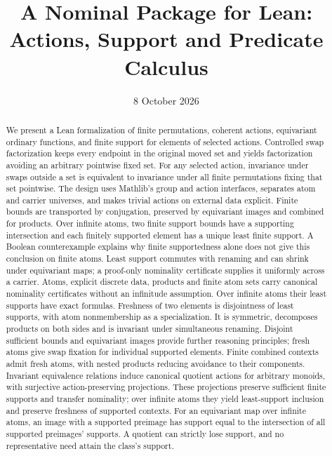 \documentclass[11pt]{article}
\title{A Nominal Package for Lean:\\Actions, Support and Predicate Calculus}
\author{}
\date{8 October 2026}
\theoremstyle{definition}
\theoremstyle{remark}
\begin{document}
\maketitle

\begin{abstract}
We present a Lean formalization of
finite permutations, coherent actions, equivariant ordinary functions,
and finite support for elements of selected actions.
Controlled swap factorization keeps every endpoint in the original moved
set and yields factorization avoiding an arbitrary pointwise fixed set.
For any selected action, invariance under swaps outside a set is equivalent
to invariance under all finite permutations fixing that set pointwise.
The design uses Mathlib's group and action interfaces, separates atom and
carrier universes, and makes trivial actions on external data explicit.
Finite bounds are transported by conjugation, preserved by equivariant
images and combined for products. Over infinite atoms, two finite support
bounds have a supporting intersection and each finitely supported element
has a unique least finite support. A Boolean counterexample explains why
finite supportedness alone does not give this conclusion on finite atoms.
Least support commutes with renaming and can shrink under equivariant maps;
a proof-only nominality certificate supplies it uniformly across a carrier.
Atoms, explicit discrete data, products and finite atom sets carry canonical
nominality certificates without an infinitude assumption.
Over infinite atoms their least supports have exact formulas. Freshness of
two elements is disjointness of least supports, with atom nonmembership as
a specialization. It is symmetric, decomposes products on both sides and
is invariant under simultaneous renaming. Disjoint sufficient bounds and
equivariant images provide further reasoning principles; fresh atoms give
swap fixation for individual supported elements.
Finite combined contexts admit fresh atoms, with nested products reducing
avoidance to their components.
Invariant equivalence relations induce canonical quotient actions for
arbitrary monoids, with surjective action-preserving projections.
These projections preserve sufficient finite supports and transfer nominality;
over infinite atoms they yield least-support inclusion and preserve freshness
of supported contexts.
For an equivariant map over infinite atoms, an image with a supported preimage
has support equal to the intersection of all supported preimages' supports.
A quotient can strictly lose support,
and no representative need attain the class's support.

\end{abstract}
\end{document}
